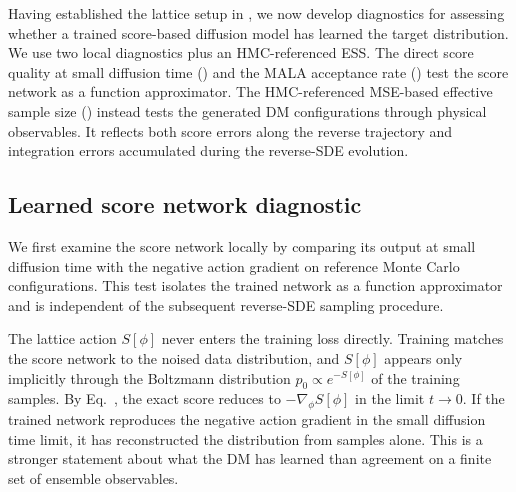 \documentclass[reprint,twocolumn,superscriptaddress,preprintnumbers,amsmath,amssymb,aps,prd,floatfix]{revtex4-2}
\def\Eq#1{Eq.~\labelcref{#1}} \def\Eqs#1{Eqs.~\labelcref{#1}}
\begin{document}
Having established the lattice setup in , we now develop diagnostics for assessing whether a trained score-based diffusion model has learned the target distribution. We use two local diagnostics plus an HMC-referenced ESS. The direct score quality at small diffusion time () and the MALA acceptance rate () test the score network as a function approximator. The HMC-referenced MSE-based effective sample size () instead tests the generated DM configurations through physical observables. It reflects both score errors along the reverse trajectory and integration errors accumulated during the reverse-SDE evolution.

\subsection{Learned score network diagnostic}
\label{sec:score_quality}

We first examine the score network locally by comparing its output at small diffusion time with the negative action gradient on reference Monte Carlo configurations. This test isolates the trained network as a function approximator and is independent of the subsequent reverse-SDE sampling procedure.

The lattice action $S[\phi]$ never enters the training loss directly. Training matches the score network to the noised data distribution, and $S[\phi]$ appears only implicitly through the Boltzmann distribution $p_0\propto e^{-S[\phi]}$ of the training samples. By \Eq{eq:score_small_t}, the exact score reduces to $-\nabla_\phi S[\phi]$ in the limit $t\to 0$. If the trained network reproduces the negative action gradient in the small diffusion time limit, it has reconstructed the distribution from samples alone. This is a stronger statement about what the DM has learned than agreement on a finite set of ensemble observables.
\end{document}
